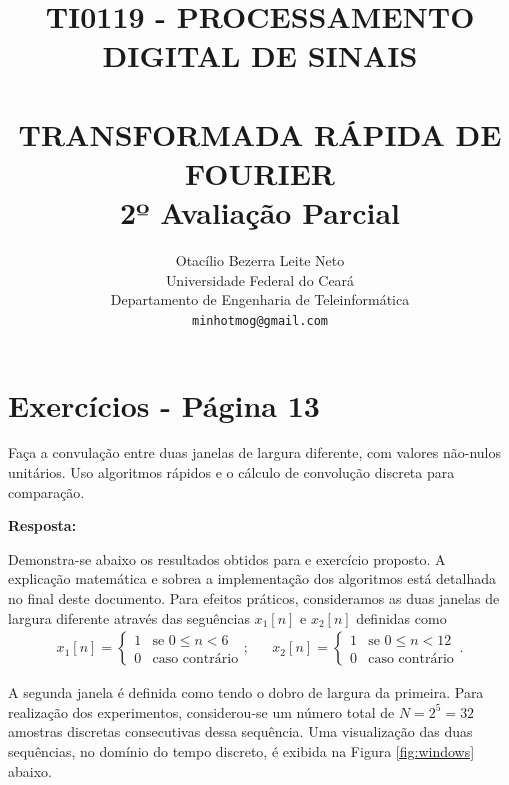 \documentclass[a4paper,11pt]{article}
\title{ \normalsize \textsc{TI0119 - PROCESSAMENTO DIGITAL DE SINAIS} 
        \\[2.0cm]             
        \HRule{0.5pt} \\              
        \LARGE \textbf{\uppercase{Transformada Rápida de Fourier}\\2º Avaliação Parcial}
        \HRule{2pt} \\[0.5cm]  
}
\author{
        Otacílio Bezerra Leite Neto\\   
        Universidade Federal do Ceará\\  
        Departamento de Engenharia de Teleinform\'atica\\
        \texttt{minhotmog@gmail.com} \\
}
\makeatletter
\numberwithin{figure}{section}
\numberwithin{equation}{section}
\numberwithin{table}{section}
\theoremstyle{definition}
\def\printtitle{
    {\centering \@title\par}}
\def\printauthor{
    {\centering \large \@author}}
\makeatother
\begin{document}
\thispagestyle{empty}       %

\printtitle                 %
    \vfill
\printauthor                %
\newpage

\setcounter{secnumdepth}{1}
\setcounter{tocdepth}{1}

\clearpage
\setcounter{page}{1}
\section{Exercícios - Página 13}

\begin{shaded}
	\noindent Faça a convulação entre duas janelas de largura diferente, com valores não-nulos unitários. Uso algoritmos rápidos e o cálculo de convolução discreta para comparação.
\end{shaded}

\noindent \textbf{Resposta:}

Demonstra-se abaixo os resultados obtidos para e exercício proposto. A explicação matemática e sobrea a implementação dos algoritmos está detalhada no final deste documento. Para efeitos práticos, consideramos as duas janelas de largura diferente através das seguências $x_1[n]$ e $x_2[n]$ definidas como
\begin{equation}
	\begin{matrix}
		x_1[n] = \begin{cases} 1 & \text{se } 0 \leq n < 6 \\ 0 & \text{caso contrário}\end{cases}; &  &
		x_2[n] = \begin{cases} 1 & \text{se } 0 \leq n < 12 \\ 0 & \text{caso contrário}\end{cases}.
	\end{matrix}
\end{equation}

\noindent A segunda janela é definida como tendo o dobro de largura da primeira. Para realização dos experimentos, considerou-se um número total de $N = 2^5 = 32$ amostras discretas consecutivas dessa sequência. Uma visualização das duas sequências, no domínio do tempo discreto, é exibida na Figura \ref{fig:windows} abaixo.
\end{document}
